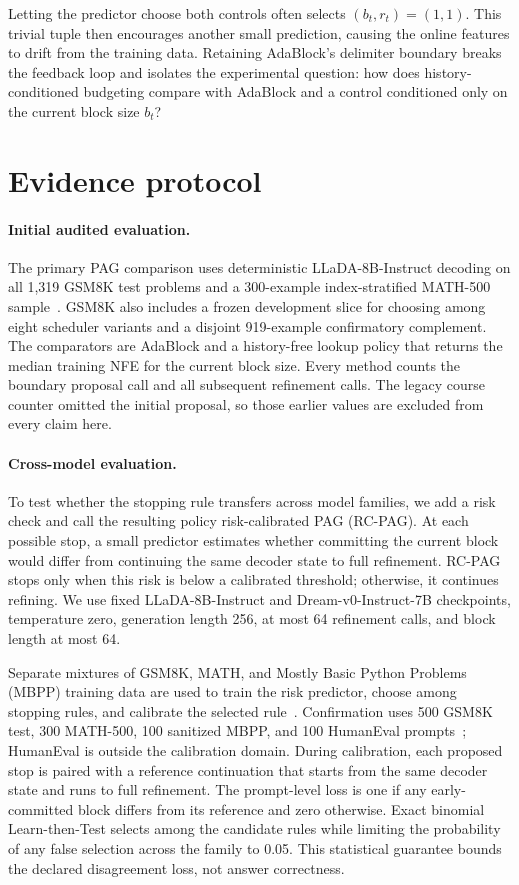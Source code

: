 \documentclass{article}
\newcommand{\pag}{PAG}
\newcommand{\rcpag}{RC-PAG}
\newcommand{\nfe}{NFE}
\begin{document}
Letting the predictor choose both controls often selects $(b_t,r_t)=(1,1)$. This trivial tuple then encourages another small prediction, causing the online features to drift from the training data. Retaining AdaBlock's delimiter boundary breaks the feedback loop and isolates the experimental question: how does history-conditioned budgeting compare with AdaBlock and a control conditioned only on the current block size $b_t$?

\section{Evidence protocol}
\label{sec:protocol}

\paragraph{Initial audited evaluation.}
The primary \pag{} comparison uses deterministic LLaDA-8B-Instruct decoding on all 1{,}319 GSM8K test problems and a 300-example index-stratified MATH-500 sample~\citep{hendrycks2021math}. GSM8K also includes a frozen development slice for choosing among eight scheduler variants and a disjoint 919-example confirmatory complement. The comparators are AdaBlock and a history-free lookup policy that returns the median training \nfe{} for the current block size. Every method counts the boundary proposal call and all subsequent refinement calls. The legacy course counter omitted the initial proposal, so those earlier values are excluded from every claim here.

\paragraph{Cross-model evaluation.}
To test whether the stopping rule transfers across model families, we add a risk check and call the resulting policy risk-calibrated \pag{} (\rcpag{}). At each possible stop, a small predictor estimates whether committing the current block would differ from continuing the same decoder state to full refinement. \rcpag{} stops only when this risk is below a calibrated threshold; otherwise, it continues refining. We use fixed LLaDA-8B-Instruct and Dream-v0-Instruct-7B checkpoints, temperature zero, generation length 256, at most 64 refinement calls, and block length at most 64.

Separate mixtures of GSM8K, MATH, and Mostly Basic Python Problems (MBPP) training data are used to train the risk predictor, choose among stopping rules, and calibrate the selected rule~\citep{austin2021mbpp}. Confirmation uses 500 GSM8K test, 300 MATH-500, 100 sanitized MBPP, and 100 HumanEval prompts~\citep{chen2021humaneval}; HumanEval is outside the calibration domain. During calibration, each proposed stop is paired with a reference continuation that starts from the same decoder state and runs to full refinement. The prompt-level loss is one if any early-committed block differs from its reference and zero otherwise. Exact binomial Learn-then-Test selects among the candidate rules while limiting the probability of any false selection across the family to 0.05. This statistical guarantee bounds the declared disagreement loss, not answer correctness.
\end{document}
